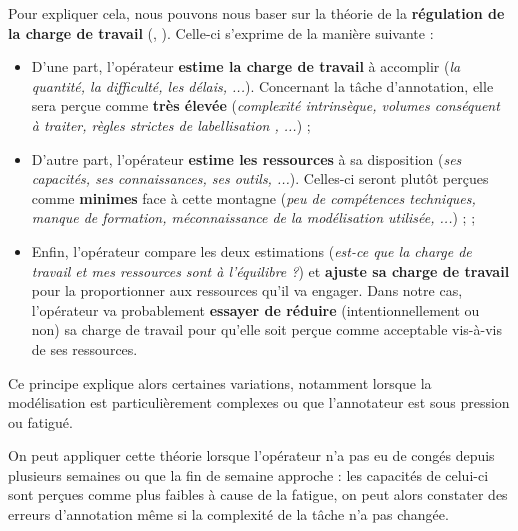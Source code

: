 			Pour expliquer cela, nous pouvons nous baser sur la théorie de la \textbf{régulation de la charge de travail} (\cite{sperandio:1978:regulation-working-methods}, \cite{sperandio:1987:ergonomie-travail-mental}).
			Celle-ci s'exprime de la manière suivante :
			\begin{itemize}
				\item D'une part, l'opérateur \textbf{estime la charge de travail} à accomplir (\textit{la quantité, la difficulté, les délais, ...}).
				Concernant la tâche d'annotation, elle sera perçue comme \textbf{très élevée} (\textit{complexité intrinsèque, volumes conséquent à traiter, règles strictes de labellisation , ...}) ;
				\item D'autre part, l'opérateur \textbf{estime les ressources} à sa disposition (\textit{ses capacités, ses connaissances, ses outils, ...}).
				Celles-ci seront plutôt perçues comme \textbf{minimes} face à cette montagne (\textit{peu de compétences techniques, manque de formation, méconnaissance de la modélisation utilisée, ...}) ;
				;
				\item Enfin, l'opérateur compare les deux estimations (\textit{est-ce que la charge de travail et mes ressources sont à l'équilibre ?}) et \textbf{ajuste sa charge de travail} pour la proportionner aux ressources qu'il va engager.
				Dans notre cas, l'opérateur va probablement \textbf{essayer de réduire} (intentionnellement ou non) sa charge de travail pour qu'elle soit perçue comme acceptable vis-à-vis de ses ressources.
			\end{itemize}
			Ce principe explique alors certaines variations, notamment lorsque la modélisation est particulièrement complexes ou que l'annotateur est sous pression ou fatigué.
			\begin{leftBarExamples}
				On peut appliquer cette théorie lorsque l'opérateur n'a pas eu de congés depuis plusieurs semaines ou que la fin de semaine approche : les capacités de celui-ci sont perçues comme plus faibles à cause de la fatigue, on peut alors constater des erreurs d'annotation même si la complexité de la tâche n'a pas changée.
			\end{leftBarExamples}
